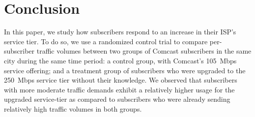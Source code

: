\section{Conclusion}\label{sec:conclusion}

In this paper, we study how subscribers respond to an increase in their
ISP's service tier. To do so, we use a randomized control trial to compare
per-subscriber traffic volumes between two groups of Comcast subscribers
in the same city during the same time period: a control group, with Comcast's
105~Mbps service offering; and a treatment group of subscribers
who were upgraded to the
250~Mbps service tier without their knowledge.  We observed that
subscribers with more moderate traffic demands exhibit a relatively 
higher usage for the upgraded service-tier as compared to subscribers who
were already sending relatively high traffic volumes in both groups.

